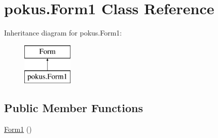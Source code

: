 \hypertarget{classpokus_1_1Form1}{}\section{pokus.\+Form1 Class Reference}
\label{classpokus_1_1Form1}
Inheritance diagram for pokus.\+Form1\+:\begin{figure}[H]
\begin{center}
\leavevmode
\includegraphics[height=2.000000cm]{classpokus_1_1Form1}
\end{center}
\end{figure}
\subsection*{Public Member Functions}
\begin{DoxyCompactItemize}
\item 
\hyperlink{classpokus_1_1Form1_ab64d54a396652470204211a4be1e404a}{Form1} ()
\end{DoxyCompactItemize}

